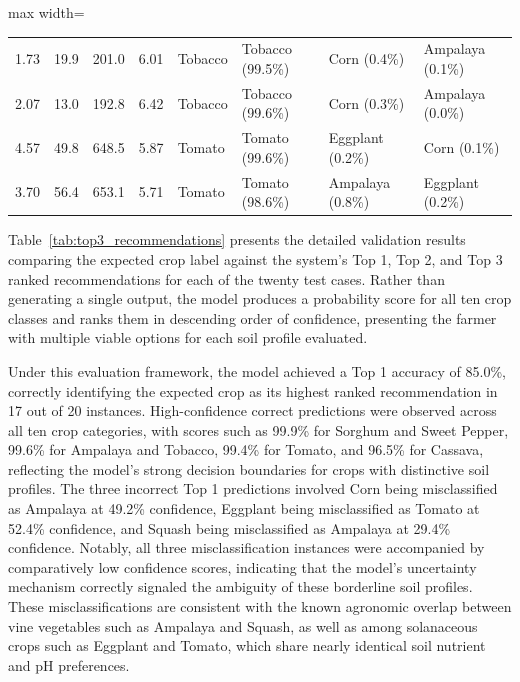 {\begin{table}[H]
\begin{adjustbox}{max width=\textwidth}
\begin{tabular}{c c c c l l l l}
			1.73 & 19.9 & 201.0 & 6.01 & Tobacco & Tobacco (99.5\%) & Corn (0.4\%) & Ampalaya (0.1\%) \\
			
			2.07 & 13.0 & 192.8 & 6.42 & Tobacco & Tobacco (99.6\%) & Corn (0.3\%) & Ampalaya (0.0\%) \\
			
			4.57 & 49.8 & 648.5 & 5.87 & Tomato & Tomato (99.6\%) & Eggplant (0.2\%) & Corn (0.1\%) \\
			
			3.70 & 56.4 & 653.1 & 5.71 & Tomato & Tomato (98.6\%) & Ampalaya (0.8\%) & Eggplant (0.2\%) \\
			
			\bottomrule
		\end{tabular}
	\end{adjustbox}
	
\end{table}
	
	Table~\ref{tab:top3_recommendations} presents the detailed validation results comparing the expected crop label against the system's Top 1, Top 2, and Top 3 ranked recommendations for each of the twenty test cases. Rather than generating a single output, the model produces a probability score for all ten crop classes and ranks them in descending order of confidence, presenting the farmer with multiple viable options for each soil profile evaluated.
	
	Under this evaluation framework, the model achieved a Top 1 accuracy of 85.0\%, correctly identifying the expected crop as its highest ranked recommendation in 17 out of 20 instances. High-confidence correct predictions were observed across all ten crop categories, with scores such as 99.9\% for Sorghum and Sweet Pepper, 99.6\% for Ampalaya and Tobacco, 99.4\% for Tomato, and 96.5\% for Cassava, reflecting the model's strong decision boundaries for crops with distinctive soil profiles. The three incorrect Top 1 predictions involved Corn being misclassified as Ampalaya at 49.2\% confidence, Eggplant being misclassified as Tomato at 52.4\% confidence, and Squash being misclassified as Ampalaya at 29.4\% confidence. Notably, all three misclassification instances were accompanied by comparatively low confidence scores, indicating that the model's uncertainty mechanism correctly signaled the ambiguity of these borderline soil profiles. These misclassifications are consistent with the known agronomic overlap between vine vegetables such as Ampalaya and Squash, as well as among solanaceous crops such as Eggplant and Tomato, which share nearly identical soil nutrient and pH preferences.
	
}
